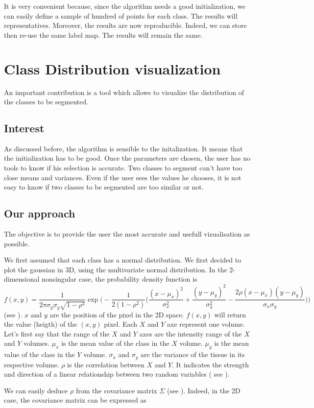 \par 
It is very convenient because, since the algorithm needs a good initialization, we can easily define a sample of hundred of points for each class. The results will representatives. Moreover, the results are now reproducible. Indeed, we can store then re-use the same label map. The results will remain the same.

%
\section{Class Distribution visualization}\label{sec:tables}

An important contribution is a tool which allows to visualize the distribution of the classes to be segmented.
\subsection{Interest}
As discussed before, the algorithm is sensible to the initalization. It means that the initialization has to be good. Once the parameters are chosen, the user has no tools to know if his selection is accurate. Two classes to segment can't have too close means and variances. Even if the user sees the values he chooses, it is not easy to know if two classes to be segmented are too similar or not.
\subsection{Our approach}
The objective is to provide the user the most accurate and usefull vizualisation as possible.
\par
We first assumed that each class has a normal distribution. We first decided to plot the gaussian in 3D, using the multivariate normal distribution.
In the 2-dimensional nonsingular case, the probability density function is 
\begin{equation*}
f(x,y)=\frac{1}{2 \pi \sigma_y \sigma_y \sqrt{1-\rho^2}} \operatorname*{exp}\Big ( -\frac{1}{2(1-\rho^2)}\Big( \frac{(x-\mu_x)^2}{\sigma_x^2} + \frac{(y-\mu_y)^2}{\sigma_y^2} - \frac{2\rho(x-\mu_x)(y-\mu_y)}{\sigma_x \sigma_y}\Big)\Big)   
\end{equation*}
(see \cite{15}). $x$ and $y$ are the position of the pixel in the 2D space. $f(x,y)$ will return the value (heigth) of the $(x,y)$ pixel. Each $X$ and  $Y$ axe represent one volume. Let's first say that the range of the $X$ and $Y$ axes are the intensity range of the $X$ and $Y$ volumes. $\mu_x$ is the mean value of the class in the $X$ volume. $\mu_y$ is the mean value of the class in the $Y$ volume. $\sigma_x$ and  $\sigma_y$ are the variance of the tissue in its respective volume. $\rho$ is the correlation between $X$ and $Y$. It indicates the strength and direction of a linear relationship between two random variables ( see \cite{16}). 
\par
We can easily deduce $\rho$ from the covariance matrix $\Sigma$ (see \cite{17}). Indeed, in the 2D case, the covariance matrix can be expressed as

